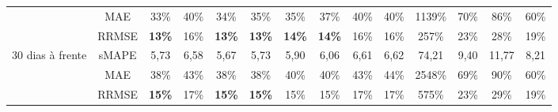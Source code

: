 \begin{table}[H]
\begin{tabular}{@{}cccccccccccccc@{}}
		& MAE      & 33\%          & 40\%          & 34\%          & 35\%          & 35\%          & 37\%          & 40\%          & 40\%          & 1139\%        & 70\% & 86\%  & 60\% \\
		& RRMSE    & \textbf{13\%} & 16\%          & \textbf{13\%} & \textbf{13\%} & \textbf{14\%} & \textbf{14\%} & 16\%          & 16\%          & 257\%         & 23\% & 28\%  & 19\% \\
		\multirow{3}{*}{30 dias à frente} & sMAPE    & 5,73          & 6,58          & 5,67          & 5,73          & 5,90          & 6,06          & 6,61          & 6,62          & 74,21         & 9,40 & 11,77 & 8,21 \\
		& MAE      & 38\%          & 43\%          & 38\%          & 38\%          & 40\%          & 40\%          & 43\%          & 44\%          & 2548\%        & 69\% & 90\%  & 60\% \\
		& RRMSE    & \textbf{15\%} & 17\%          & \textbf{15\%} & \textbf{15\%} & 15\%          & 15\%          & 17\%          & 17\%          & 575\%         & 23\% & 29\%  & 19\% \\ \cmidrule(l){2-14} 
	\end{tabular}
\end{table}

